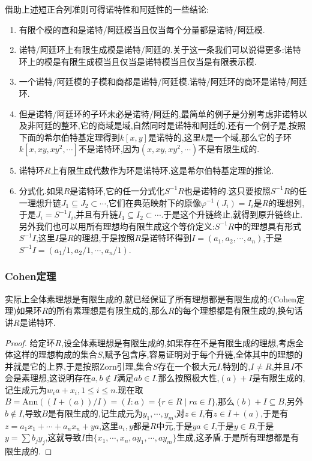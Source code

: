借助上述短正合列准则可得诺特性和阿廷性的一些结论:
\begin{enumerate}
	\item 有限个模的直和是诺特/阿廷模当且仅当每个分量都是诺特/阿廷模.
	\item 诺特/阿廷环上有限生成模是诺特/阿廷的.关于这一条我们可以说得更多:诺特环上的模是有限生成模当且仅当是诺特模当且仅当是有限表示模.
	\item 一个诺特/阿廷模的子模和商都是诺特/阿廷模.诺特/阿廷环的商环是诺特/阿廷环.
	\item 但是诺特/阿廷环的子环未必是诺特/阿廷的,最简单的例子是分别考虑非诺特以及非阿廷的整环,它的商域是域,自然同时是诺特和阿廷的.还有一个例子是,按照下面的希尔伯特基定理得到$k[x,y]$是诺特的,这里$k$是一个域,那么它的子环$k[x,xy,xy^2,\cdots]$不是诺特环,因为$(x,xy,xy^2,\cdots)$不是有限生成的.
	\item 诺特环$R$上有限生成代数作为环是诺特环.这是希尔伯特基定理的推论.
	\item 分式化.如果$R$是诺特环,它的任一分式化$S^{-1}R$也是诺特的.这只要按照$S^{-1}R$的任一理想升链$J_1\subseteq J_2\subset\cdots$,它们在典范映射下的原像$\varphi^{-1}(J_i)=I_i$是$R$的理想列,于是$J_i=S^{-1}I_i$,并且有升链$I_1\subseteq I_2\subset\cdots$.于是这个升链终止,就得到原升链终止.另外我们也可以用所有理想均有限生成这个等价定义:$S^{-1}R$中的理想具有形式$S^{-1}I$,这里$I$是$R$的理想,于是按照$R$是诺特环得到$I=(a_1,a_2,\cdots,a_n)$,于是$S^{-1}I=(a_1/1,a_2/1,\cdots,a_n/1)$.
\end{enumerate}
\subsubsection{Cohen定理}

实际上全体素理想是有限生成的,就已经保证了所有理想都是有限生成的:(Cohen定理)如果环$R$的所有素理想是有限生成的,那么$R$的每个理想都是有限生成的,换句话讲$R$是诺特环.
\begin{proof}
	
	给定环$R$,设全体素理想是有限生成的,如果存在不是有限生成的理想,考虑全体这样的理想构成的集合$S$,赋予包含序,容易证明对于每个升链,全体其中的理想的并就是它的上界,于是按照Zorn引理,集合$S$存在一个极大元$I$.特别的,$I\not=R$,并且$I$不会是素理想,这说明存在$a,b\not\in I$满足$ab\in I$.那么按照极大性,$(a)+I$是有限生成的,记生成元为$w_ia+x_i,1\le i\le n$.现在取$B=\mathrm{Ann}((I+(a))/I)=(I:a)=\{r\in R\mid ra\in I\}$,那么$(b)+I\subseteq B$,另外$b\not\in I$,导致$B$是有限生成的,记生成元为$y_1,\cdots,y_m$,对$z\in I$,有$z\in I+(a)$,于是有$z=a_1x_1+\cdots+a_nx_n+ya$,这里$a_i,y$都是$R$中元,于是$ya\in I$,于是$y\in B$,于是$y=\sum b_jy_j$,这就导致$I$由$\{x_1,\cdots,x_n,ay_1,\cdots,ay_m\}$生成,这矛盾.于是所有理想都是有限生成的.
\end{proof}

